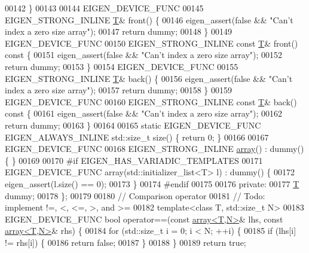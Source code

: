 \begin{DoxyCode}
00142   \}
00143 
00144   EIGEN\_DEVICE\_FUNC
00145   EIGEN\_STRONG\_INLINE \hyperlink{group___sparse_core___module}{T}& front() \{
00146     eigen\_assert(\textcolor{keyword}{false} && \textcolor{stringliteral}{"Can't index a zero size array"});
00147     \textcolor{keywordflow}{return} dummy;
00148   \}
00149   EIGEN\_DEVICE\_FUNC
00150   EIGEN\_STRONG\_INLINE \textcolor{keyword}{const} \hyperlink{group___sparse_core___module}{T}& front()\textcolor{keyword}{ const }\{
00151     eigen\_assert(\textcolor{keyword}{false} && \textcolor{stringliteral}{"Can't index a zero size array"});
00152     \textcolor{keywordflow}{return} dummy;
00153   \}
00154   EIGEN\_DEVICE\_FUNC
00155   EIGEN\_STRONG\_INLINE \hyperlink{group___sparse_core___module}{T}& back() \{
00156     eigen\_assert(\textcolor{keyword}{false} && \textcolor{stringliteral}{"Can't index a zero size array"});
00157     \textcolor{keywordflow}{return} dummy;
00158   \}
00159   EIGEN\_DEVICE\_FUNC
00160   EIGEN\_STRONG\_INLINE \textcolor{keyword}{const} \hyperlink{group___sparse_core___module}{T}& back()\textcolor{keyword}{ const }\{
00161     eigen\_assert(\textcolor{keyword}{false} && \textcolor{stringliteral}{"Can't index a zero size array"});
00162     \textcolor{keywordflow}{return} dummy;
00163   \}
00164 
00165   \textcolor{keyword}{static} EIGEN\_DEVICE\_FUNC EIGEN\_ALWAYS\_INLINE std::size\_t size() \{ \textcolor{keywordflow}{return} 0; \}
00166 
00167   EIGEN\_DEVICE\_FUNC
00168   EIGEN\_STRONG\_INLINE \hyperlink{class_eigen_1_1array}{array}() : dummy() \{ \}
00169 
00170 \textcolor{preprocessor}{#if EIGEN\_HAS\_VARIADIC\_TEMPLATES}
00171   EIGEN\_DEVICE\_FUNC array(std::initializer\_list<T> l) : dummy() \{
00172     eigen\_assert(l.size() == 0);
00173   \}
00174 \textcolor{preprocessor}{#endif}
00175 
00176  \textcolor{keyword}{private}:
00177   \hyperlink{group___sparse_core___module}{T} dummy;
00178 \};
00179 
00180 \textcolor{comment}{// Comparison operator}
00181 \textcolor{comment}{// Todo: implement !=, <, <=, >,  and >=}
00182 \textcolor{keyword}{template}<\textcolor{keyword}{class} T, std::\textcolor{keywordtype}{size\_t} N>
00183 EIGEN\_DEVICE\_FUNC \textcolor{keywordtype}{bool} operator==(\textcolor{keyword}{const} \hyperlink{class_eigen_1_1array}{array<T,N>}& lhs, \textcolor{keyword}{const} 
      \hyperlink{class_eigen_1_1array}{array<T,N>}& rhs) \{
00184   \textcolor{keywordflow}{for} (std::size\_t i = 0; i < N; ++i) \{
00185     \textcolor{keywordflow}{if} (lhs[i] != rhs[i]) \{
00186       \textcolor{keywordflow}{return} \textcolor{keyword}{false};
00187     \}
00188   \}
00189   \textcolor{keywordflow}{return} \textcolor{keyword}{true};

\end{DoxyCode}
